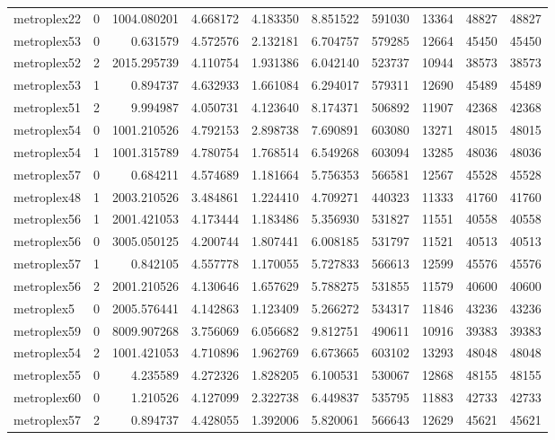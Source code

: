 \begin{longtable}{|l|r|r|r|r|r|r|r|r|r|}
metroplex22 & 0 & 1004.080201 & 4.668172 & 4.183350 & 8.851522 & 591030 & 13364 & 48827 & 48827 \\
metroplex53 & 0 & 0.631579 & 4.572576 & 2.132181 & 6.704757 & 579285 & 12664 & 45450 & 45450 \\
metroplex52 & 2 & 2015.295739 & 4.110754 & 1.931386 & 6.042140 & 523737 & 10944 & 38573 & 38573 \\
metroplex53 & 1 & 0.894737 & 4.632933 & 1.661084 & 6.294017 & 579311 & 12690 & 45489 & 45489 \\
metroplex51 & 2 & 9.994987 & 4.050731 & 4.123640 & 8.174371 & 506892 & 11907 & 42368 & 42368 \\
metroplex54 & 0 & 1001.210526 & 4.792153 & 2.898738 & 7.690891 & 603080 & 13271 & 48015 & 48015 \\
metroplex54 & 1 & 1001.315789 & 4.780754 & 1.768514 & 6.549268 & 603094 & 13285 & 48036 & 48036 \\
metroplex57 & 0 & 0.684211 & 4.574689 & 1.181664 & 5.756353 & 566581 & 12567 & 45528 & 45528 \\
metroplex48 & 1 & 2003.210526 & 3.484861 & 1.224410 & 4.709271 & 440323 & 11333 & 41760 & 41760 \\
metroplex56 & 1 & 2001.421053 & 4.173444 & 1.183486 & 5.356930 & 531827 & 11551 & 40558 & 40558 \\
metroplex56 & 0 & 3005.050125 & 4.200744 & 1.807441 & 6.008185 & 531797 & 11521 & 40513 & 40513 \\
metroplex57 & 1 & 0.842105 & 4.557778 & 1.170055 & 5.727833 & 566613 & 12599 & 45576 & 45576 \\
metroplex56 & 2 & 2001.210526 & 4.130646 & 1.657629 & 5.788275 & 531855 & 11579 & 40600 & 40600 \\
metroplex5 & 0 & 2005.576441 & 4.142863 & 1.123409 & 5.266272 & 534317 & 11846 & 43236 & 43236 \\
metroplex59 & 0 & 8009.907268 & 3.756069 & 6.056682 & 9.812751 & 490611 & 10916 & 39383 & 39383 \\
metroplex54 & 2 & 1001.421053 & 4.710896 & 1.962769 & 6.673665 & 603102 & 13293 & 48048 & 48048 \\
metroplex55 & 0 & 4.235589 & 4.272326 & 1.828205 & 6.100531 & 530067 & 12868 & 48155 & 48155 \\
metroplex60 & 0 & 1.210526 & 4.127099 & 2.322738 & 6.449837 & 535795 & 11883 & 42733 & 42733 \\
metroplex57 & 2 & 0.894737 & 4.428055 & 1.392006 & 5.820061 & 566643 & 12629 & 45621 & 45621 \\

\end{longtable}
